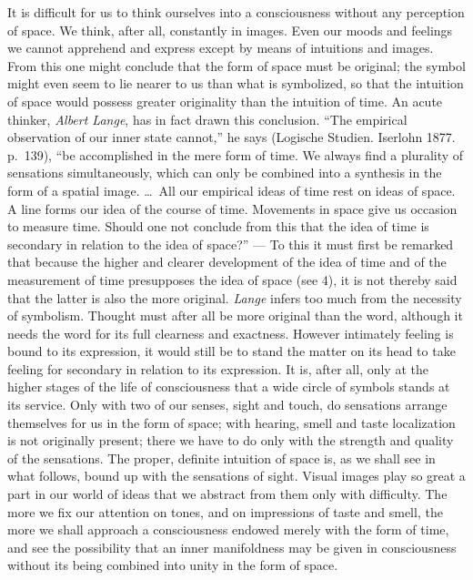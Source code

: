 \documentclass[12pt,a4paper]{book}
\newcommand{\opage}[1]{\marginnote{\footnotesize\textit{[#1]}}}
\begin{document}
It is difficult for us to think ourselves into a consciousness without
any perception of space. We think, after all, constantly in images. Even
our moods and feelings we cannot apprehend and express except by means
of intuitions and images. From this one might conclude that the form of
space must be original; the symbol might even seem to lie nearer to us
than what is symbolized, so that the intuition of space would possess
greater originality than the intuition of time. An acute thinker,
\emph{Albert Lange}, has in fact drawn this conclusion. ``The empirical
observation of our inner state cannot,'' he says (Logische Studien.
Iserlohn 1877. p.~139), ``be accomplished in the mere form of time. We
always find a plurality of sensations simultaneously, which can only be
combined into a synthesis in the form of a spatial image. \ldots\ All
our empirical ideas of time rest on ideas of space. A line forms our idea
of the course of time. Movements in space give us occasion to measure
time. Should one not conclude from this that the idea of time is
secondary in relation to the idea of space?'' --- To this it must first
be remarked that because the higher and clearer development of the idea
of time and of the measurement of time presupposes the idea of space
(see 4), it is not thereby said that the latter is also the more
original. \emph{Lange} infers too much from the necessity of symbolism.
Thought must after all be more original than the word, although it needs
the word for its full
\opage{236}clearness and exactness. However intimately feeling is bound
to its expression, it would still be to stand the matter on its head to
take feeling for secondary in relation to its expression. It is, after
all, only at the higher stages of the life of consciousness that a wide
circle of symbols stands at its service. Only with two of our senses,
sight and touch, do sensations arrange themselves for us in the form of
space; with hearing, smell and taste localization is not originally
present; there we have to do only with the strength and quality of the
sensations. The proper, definite intuition of space is, as we shall see
in what follows, bound up with the sensations of sight. Visual images
play so great a part in our world of ideas that we abstract from them
only with difficulty. The more we fix our attention on tones, and on
impressions of taste and smell, the more we shall approach a
consciousness endowed merely with the form of time, and see the
possibility that an inner manifoldness may be given in consciousness
without its being combined into unity in the form of space.
\end{document}
